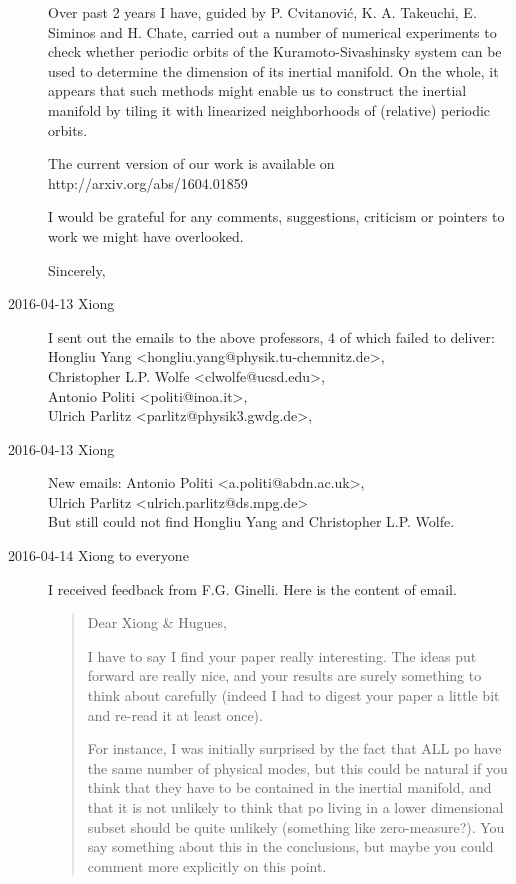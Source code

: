 \begin{description}
Over past 2 years I have, guided by P. Cvitanovi\'c, K. A. Takeuchi,
E. Siminos and H. Chate, carried out a number of numerical experiments
to check whether periodic orbits of the Kuramoto-Sivashinsky system can
be used to determine the dimension of its inertial manifold. On the
whole, it appears that such methods might enable us to construct the
inertial manifold by tiling it with linearized neighborhoods of
(relative) periodic orbits.

The current version of our work is available on
http://arxiv.org/abs/1604.01859

I would be grateful for any comments, suggestions, criticism or pointers
to work we might have overlooked.

Sincerely,

\item[2016-04-13 Xiong]
I sent out the emails to the above professors, 4 of which failed to deliver:
Hongliu Yang <hongliu.yang@physik.tu-chemnitz.de>, \\
Christopher L.P. Wolfe <clwolfe@ucsd.edu>, \\
Antonio Politi <politi@inoa.it>,\\
Ulrich Parlitz <parlitz@physik3.gwdg.de>,

\item[2016-04-13 Xiong]
New emails:
Antonio Politi <a.politi@abdn.ac.uk>,\\
Ulrich Parlitz <ulrich.parlitz@ds.mpg.de> \\
But still could not find Hongliu Yang and Christopher L.P. Wolfe.

\item[2016-04-14 Xiong to everyone] I received feedback from F.G. Ginelli.
Here is the content of email.

\renewcommand{\edit}[1]{{\color{red} #1}} %


\begin{quotation}

Dear Xiong \& Hugues,

I have to say I find your paper really interesting. The ideas put forward
are really nice, and your results are surely something to think about
carefully (indeed I had to digest your paper a little bit and re-read
it at least once).

For instance, I was initially surprised by the fact that ALL po have the
same number of physical modes, but this could be natural if you think that
they have to be contained in the inertial manifold, and that it is not
unlikely to think that po
living in a lower dimensional subset should be quite unlikely
(something like zero-measure?). You say something about this in
the conclusions, but maybe you could comment more explicitly on this point.


\end{quotation}
\end{description}
